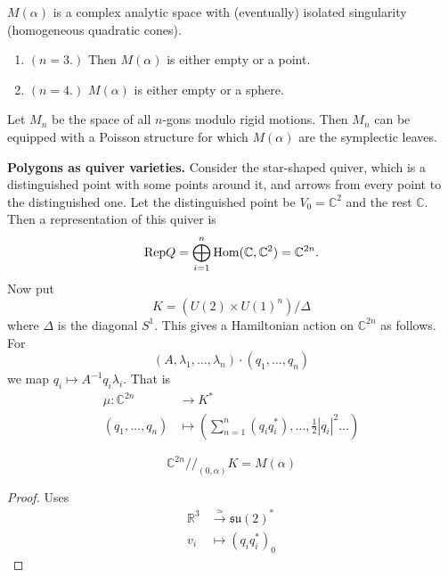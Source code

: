 \begin{theorem}
\label{theorem-Kapovich-Millson}
$M(\alpha)$ is a complex analytic space
with (eventually) isolated singularity
(homogeneous quadratic cones).
\end{theorem}

\begin{example}
\label{examples-polygon-moduli-spaces}
\begin{enumerate}
\item $(n=3.)$ Then $M(\alpha)$ is either
empty or a point.

\item $(n=4.)$ $M(\alpha)$ is either empty or
a sphere.
\end{enumerate}
\end{example}

\begin{remark}
\label{remark-Hausmann-Knutson}
Let $M_n$ be the space of all $n$-gons
modulo rigid motions. Then $M_n$
can be equipped with a Poisson structure
for which $M(\alpha)$ are the symplectic
leaves.

\medskip\noindent
{\bf Polygons as quiver varieties.}
Consider the star-shaped quiver,
which is a distinguished point with some
points around it,
and arrows from every point to the
distinguished one.
Let the distinguished point be
$V_0=\mathbb{C}^2$ and
the rest $\mathbb{C}$. Then a representation
of this quiver
is
$$
\text{Rep}Q=\bigoplus_{i=1}^n
\mathop{\mathrm{Hom}}\nolimits(\mathbb{C},\mathbb{C}^2)=\mathbb{C}^{2n}
.
$$
Now put
$$
K=(U(2) \times U(1)^n)/\Delta
$$
where $\Delta$ is the diagonal $S^1$.
This gives a Hamiltonian action on
$\mathbb{C}^{2n}$
as follows. For
$$
(A,\lambda_1,\ldots,\lambda_n)\cdot
(q_1,\ldots,q_n)
$$
we map
$q_i \mapsto  A^{-1}q_i \lambda_i$.
That is
$$
\begin{aligned}
\mu: \mathbb{C}^{2n} &\longrightarrow K^* \\
(q_1,\ldots,q_n) &\longmapsto
\left(\sum_{n=1}^n (q_iq_i^*
),\ldots,\frac{1}{2}|q_i|^2\ldots\right)
\end{aligned}
$$

\begin{theorem}
\label{theorem-Hausmann-Knutson}
$$
\mathbb{C}^{2n}/\!/_{(0,\alpha)}K=M(\alpha)
$$
\end{theorem}

\begin{proof}
Uses
$$
\begin{aligned}
\mathbb{R}^3  &\xrightarrow{\simeq}
\mathfrak{su}(2)^* \\
v_i &\longmapsto (q_iq_i^*)_0
\end{aligned}
$$
\end{proof}
\end{remark}

